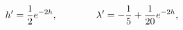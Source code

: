 \begin{equation}
h'={1\over2}e^{-2h},\qquad \qquad
\lambda'=-{1\over 5}+{1\over 20}e^{-2h},\label{u11}
\end{equation}

